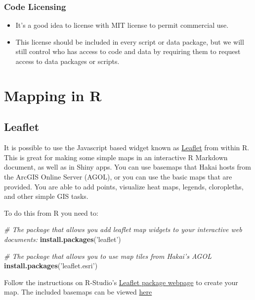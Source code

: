 \documentclass[]{book}
\newenvironment{Shaded}{\begin{snugshade}}{\end{snugshade}}
\newcommand{\KeywordTok}[1]{\textcolor[rgb]{0.13,0.29,0.53}{\textbf{#1}}}
\newcommand{\StringTok}[1]{\textcolor[rgb]{0.31,0.60,0.02}{#1}}
\newcommand{\CommentTok}[1]{\textcolor[rgb]{0.56,0.35,0.01}{\textit{#1}}}
\newcommand{\NormalTok}[1]{#1}
\begin{document}
\subsection{Code Licensing}\label{code-licensing}

\begin{itemize}
\item
  It's a good idea to license with MIT license to permit commercial use.
\item
  This license should be included in every script or data package, but
  we will still control who has access to code and data by requiring
  them to request access to data packages or scripts.
\end{itemize}

\chapter{Mapping in R}\label{mapping-in-r}

\section{Leaflet}\label{leaflet}

It is possible to use the Javascript based widget known as
\href{https://rstudio.github.io/leaflet/}{Leaflet} from within R. This
is great for making some simple maps in an interactive R Markdown
document, as well as in Shiny apps. You can use basemaps that Hakai
hosts from the ArcGIS Online Server (AGOL), or you can use the basic
maps that are provided. You are able to add points, visualize heat maps,
legends, cloropleths, and other simple GIS tasks.

To do this from R you need to:

\begin{Shaded}
\begin{Highlighting}[]
\CommentTok{# The package that allows you add leaflet map widgets to your interactive web documents:}
\KeywordTok{install.packages}\NormalTok{(}\StringTok{'leaflet'}\NormalTok{)}

\CommentTok{# The package that allows you to use map tiles from Hakai's AGOL}
\KeywordTok{install.packages}\NormalTok{(}\StringTok{'leaflet.esri'}\NormalTok{)}
\end{Highlighting}
\end{Shaded}

Follow the instructions on R-Studio's
\href{https://rstudio.github.io/leaflet/}{Leaflet package webpage} to
create your map. The included basemaps can be viewed
\href{https://leaflet-extras.github.io/leaflet-providers/preview/index.html}{here}
\end{document}

